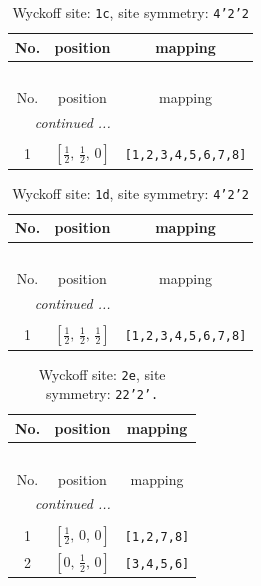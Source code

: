 \documentclass[fleqn,8pt]{jsarticle}
\begin{document}
\begin{longtable}{ccc}
\caption{Wyckoff site: {\tt 1c}, site symmetry: {\tt 4'2'2}}
 \\
 \hline \hline
No. & position & mapping \\ \hline \endfirsthead

\multicolumn{2}{l}{\tablename\ \thetable{}} \\
 \hline \hline
No. & position & mapping \\ \hline \endhead

 \hline \hline
\multicolumn{2}{r}{\footnotesize\it continued ...} \\ \endfoot

 \hline \hline
\multicolumn{2}{r}{} \\ \endlastfoot

1 & $\left[ \frac{1}{2},\, \frac{1}{2},\, 0 \right]$ & {\tt [1,2,3,4,5,6,7,8]} \\
\end{longtable}
\renewcommand{\arraystretch}{1.2}
\begin{longtable}{ccc}
\caption{Wyckoff site: {\tt 1d}, site symmetry: {\tt 4'2'2}}
 \\
 \hline \hline
No. & position & mapping \\ \hline \endfirsthead

\multicolumn{2}{l}{\tablename\ \thetable{}} \\
 \hline \hline
No. & position & mapping \\ \hline \endhead

 \hline \hline
\multicolumn{2}{r}{\footnotesize\it continued ...} \\ \endfoot

 \hline \hline
\multicolumn{2}{r}{} \\ \endlastfoot

1 & $\left[ \frac{1}{2},\, \frac{1}{2},\, \frac{1}{2} \right]$ & {\tt [1,2,3,4,5,6,7,8]} \\
\end{longtable}
\renewcommand{\arraystretch}{1.2}
\begin{longtable}{ccc}
\caption{Wyckoff site: {\tt 2e}, site symmetry: {\tt 22'2'.}}
 \\
 \hline \hline
No. & position & mapping \\ \hline \endfirsthead

\multicolumn{2}{l}{\tablename\ \thetable{}} \\
 \hline \hline
No. & position & mapping \\ \hline \endhead

 \hline \hline
\multicolumn{2}{r}{\footnotesize\it continued ...} \\ \endfoot

 \hline \hline
\multicolumn{2}{r}{} \\ \endlastfoot

1 & $\left[ \frac{1}{2},\, 0,\, 0 \right]$ & {\tt [1,2,7,8]} \\ \hline
2 & $\left[ 0,\, \frac{1}{2},\, 0 \right]$ & {\tt [3,4,5,6]} \\
\end{longtable}
\end{document}
